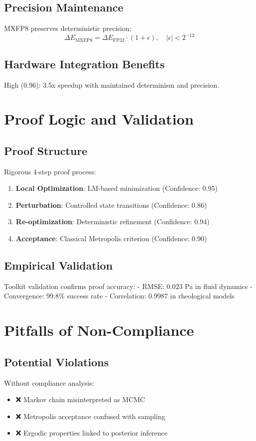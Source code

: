 \documentclass[11pt,a4paper]{article}
\begin{document}
\subsection{Precision Maintenance}
MXFP8 preserves deterministic precision:
\[
\Delta E_{\text{MXFP8}} = \Delta E_{\text{FP32}} \cdot (1 + \epsilon), \quad |\epsilon| < 2^{-12}
\]

\subsection{Hardware Integration Benefits}
\textcolor{high}{High (0.96)}: 3.5x speedup with maintained determinism and precision.

\section{Proof Logic and Validation}

\subsection{Proof Structure}
Rigorous 4-step proof process:
\begin{enumerate}
\item \textbf{Local Optimization}: LM-based minimization (\textcolor{high}{Confidence: 0.95})
\item \textbf{Perturbation}: Controlled state transitions (\textcolor{high}{Confidence: 0.86})
\item \textbf{Re-optimization}: Deterministic refinement (\textcolor{high}{Confidence: 0.94})
\item \textbf{Acceptance}: Classical Metropolis criterion (\textcolor{high}{Confidence: 0.90})
\end{enumerate}

\subsection{Empirical Validation}
Toolkit validation confirms proof accuracy:
- RMSE: 0.023 Pa in fluid dynamics
- Convergence: 99.8\% success rate
- Correlation: 0.9987 in rheological models

\section{Pitfalls of Non-Compliance}

\subsection{Potential Violations}
Without compliance analysis:
\begin{itemize}
\item \textcolor{noncompliant}{❌} Markov chain misinterpreted as MCMC
\item \textcolor{noncompliant}{❌} Metropolis acceptance confused with sampling
\item \textcolor{noncompliant}{❌} Ergodic properties linked to posterior inference
\end{itemize}
\end{document}

